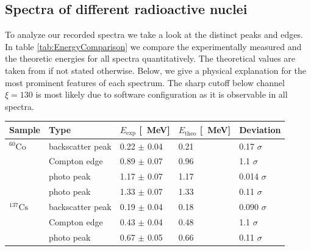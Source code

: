 \subsection*{Spectra of different radioactive nuclei}
%
To analyze our recorded spectra we take a look at the distinct peaks and edges.
In table \ref{tab:EnergyComparison} we compare the experimentally measured and the theoretic energies for all spectra quantitatively.
The theoretical values are taken from \cite{Anleitung} if not stated otherwise.
Below, we give a physical explanation for the most prominent features of each spectrum.
The sharp cutoff below channel $\xi = 130$ is most likely due to software configuration as it is observable in all spectra.
%
\par
%
\minipage{\linewidth}
    \begin{center}
        \captionsetup{type=table}
        \begin{adjustbox}{max width=\linewidth, keepaspectratio}
            \begin{tabular}{lllll}
            \toprule
            Sample            & Type             & $E_{\text{exp}}$ [\SI{}{\mega\electronvolt}] & $E_{\text{theo}}$ [\SI{}{\mega\electronvolt}] & Deviation      \\
            \midrule
            $^{60}\text{Co}$  & backscatter peak & 0.22 $\pm$ 0.04                              & 0.21                                          & 0.17  $\sigma$ \\
            ~                 & Compton edge     & 0.89 $\pm$ 0.07                              & 0.96                                          & 1.1   $\sigma$ \\
            ~                 & photo peak       & 1.17 $\pm$ 0.07                              & 1.17                                          & 0.014 $\sigma$ \\
            ~                 & photo peak       & 1.33 $\pm$ 0.07                              & 1.33                                          & 0.11  $\sigma$ \\
            $^{137}\text{Cs}$ & backscatter peak & 0.19 $\pm$ 0.04                              & 0.18                                          & 0.090 $\sigma$ \\
            ~                 & Compton edge     & 0.43 $\pm$ 0.04                              & 0.48                                          & 1.1   $\sigma$ \\
            ~                 & photo peak       & 0.67 $\pm$ 0.05                              & 0.66                                          & 0.11  $\sigma$ \\

\end{tabular}
\end{adjustbox}
\end{center}
